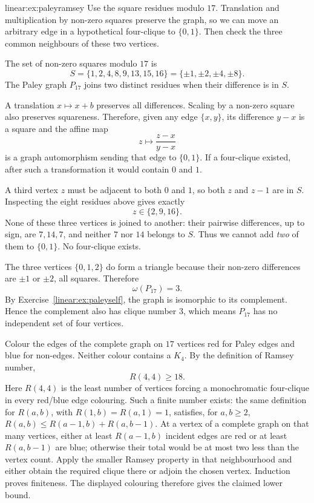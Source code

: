\begin{solution}{linear:ex:paleyramsey}
\idea Use the square residues modulo $17$. Translation and multiplication by non-zero squares preserve the graph, so we can move an arbitrary edge in a hypothetical four-clique to $\{0,1\}$. Then check the three common neighbours of these two vertices.

\writeup The set of non-zero squares modulo $17$ is
\[
S=\{1,2,4,8,9,13,15,16\}=\{\pm1,\pm2,\pm4,\pm8\}.
\]
The Paley graph $P_{17}$ joins two distinct residues when their difference is in $S$.

A translation $x\mapsto x+b$ preserves all differences. Scaling by a non-zero square also preserves squareness. Therefore, given any edge $\{x,y\}$, its difference $y-x$ is a square and the affine map
\[
z\longmapsto\frac{z-x}{y-x}
\]
is a graph automorphism sending that edge to $\{0,1\}$. If a four-clique existed, after such a transformation it would contain $0$ and $1$.

A third vertex $z$ must be adjacent to both $0$ and $1$, so both $z$ and $z-1$ are in $S$. Inspecting the eight residues above gives exactly
\[
z\in\{2,9,16\}.
\]
None of these three vertices is joined to another: their pairwise differences, up to sign, are $7,14,7$, and neither $7$ nor $14$ belongs to $S$. Thus we cannot add \emph{two} of them to $\{0,1\}$. No four-clique exists.

The three vertices $\{0,1,2\}$ do form a triangle because their non-zero differences are $\pm1$ or $\pm2$, all squares. Therefore
\[
\boxed{\omega(P_{17})=3}.
\]
By Exercise~\ref{linear:ex:paleyself}, the graph is isomorphic to its complement. Hence the complement also has clique number $3$, which means $P_{17}$ has no independent set of four vertices.

Colour the edges of the complete graph on $17$ vertices red for Paley edges and blue for non-edges. Neither colour contains a $K_4$. By the definition of Ramsey number,
\[
\boxed{R(4,4)\ge18}.
\]
Here $R(4,4)$ is the least number of vertices forcing a monochromatic
four-clique in every red/blue edge colouring. Such a finite number exists:
the same definition for $R(a,b)$, with $R(1,b)=R(a,1)=1$, satisfies, for $a,b\ge2$,
$R(a,b)\le R(a-1,b)+R(a,b-1)$. At a vertex of a complete graph on that
many vertices, either at least $R(a-1,b)$ incident edges are red or at least
$R(a,b-1)$ are blue; otherwise their total would be at most two less than
the vertex count. Apply the smaller Ramsey property in that neighbourhood
and either obtain the required clique there or adjoin the chosen vertex.
Induction proves finiteness. The displayed colouring therefore gives the
claimed lower bound.
\end{solution}

